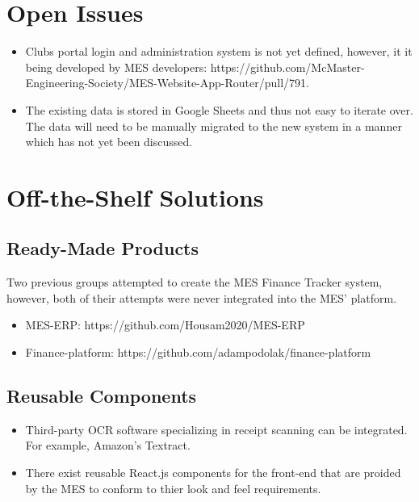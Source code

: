 \documentclass[12pt]{article}
\begin{document}
\section{Open Issues}
  \begin{itemize}
    \item Clubs portal login and administration system is not yet defined, however, it it being developed by MES developers: https://github.com/McMaster-Engineering-Society/MES-Website-App-Router/pull/791.
    \item The existing data is stored in Google Sheets and thus not easy to iterate over. The data will need to be manually migrated to the new system in a manner which has not yet been discussed.
  \end{itemize}

\section{Off-the-Shelf Solutions}
  \subsection{Ready-Made Products}
  Two previous groups attempted to create the MES Finance Tracker system, however, both of their attempts were never integrated into the MES' platform.  
  \begin{itemize}
      \item MES-ERP: https://github.com/Housam2020/MES-ERP
      \item Finance-platform: https://github.com/adampodolak/finance-platform
    \end{itemize}

  \subsection{Reusable Components}
    \begin{itemize}
      \item Third-party OCR software specializing in receipt scanning can be integrated. For example, Amazon's Textract.
      \item There exist reusable React.js components for the front-end that are proided by the MES to conform to thier look and feel requirements.
    \end{itemize}
\end{document}
